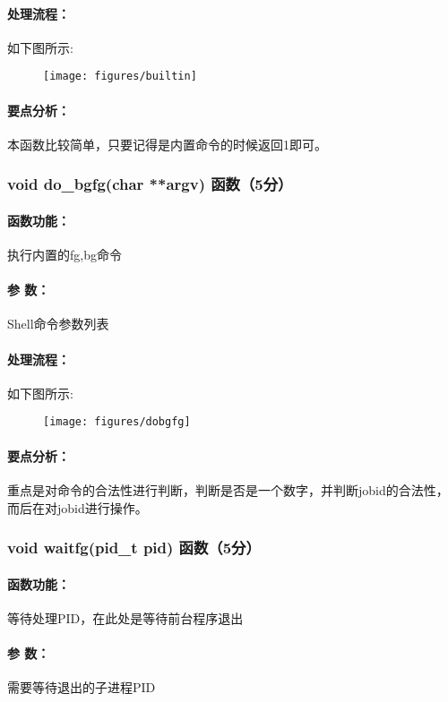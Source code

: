 \paragraph{处理流程：}如下图所示:
\begin{figure}[H]
  \centering 
  \texttt{[image: figures/builtin]}
\end{figure}
\paragraph{要点分析：}本函数比较简单，只要记得是内置命令的时候返回1即可。

\subsubsection{void do\_bgfg(char **argv) 函数（5分）}

\paragraph{函数功能：}执行内置的fg,bg命令
\paragraph{参   数：}Shell命令参数列表
\paragraph{处理流程：}如下图所示:
\begin{figure}[H]
    \centering 
    \texttt{[image: figures/dobgfg]}
\end{figure}
\paragraph{要点分析：}重点是对命令的合法性进行判断，判断是否是一个数字，并判断jobid的合法性，而后在对jobid进行操作。

\subsubsection{void waitfg(pid\_t pid) 函数（5分）}

\paragraph{函数功能：}等待处理PID，在此处是等待前台程序退出
\paragraph{参   数：}需要等待退出的子进程PID
